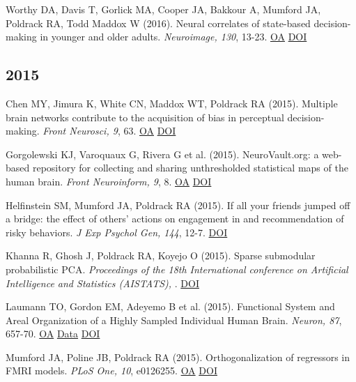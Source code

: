 \documentclass[10pt, letterpaper]{article}
\begin{document}
Worthy DA, Davis T, Gorlick MA, Cooper JA, Bakkour A, Mumford JA, Poldrack RA, Todd Maddox W (2016). Neural correlates of state-based decision-making in younger and older adults. \textit{Neuroimage, 130}, 13-23. \href{https://www.ncbi.nlm.nih.gov/pmc/articles/PMC4808466}{OA} \href{http://dx.doi.org/10.1016/j.neuroimage.2015.12.004}{DOI} \vspace{2mm}

\subsection*{2015}Chen MY, Jimura K, White CN, Maddox WT, Poldrack RA (2015). Multiple brain networks contribute to the acquisition of bias in perceptual decision-making. \textit{Front Neurosci, 9}, 63. \href{https://www.ncbi.nlm.nih.gov/pmc/articles/PMC4350407}{OA} \href{http://dx.doi.org/10.3389/fnins.2015.00063}{DOI} \vspace{2mm}

Gorgolewski KJ, Varoquaux G, Rivera G et al. (2015). NeuroVault.org: a web-based repository for collecting and sharing unthresholded statistical maps of the human brain. \textit{Front Neuroinform, 9}, 8. \href{https://www.ncbi.nlm.nih.gov/pmc/articles/PMC4392315}{OA} \href{http://dx.doi.org/10.3389/fninf.2015.00008}{DOI} \vspace{2mm}

Helfinstein SM, Mumford JA, Poldrack RA (2015). If all your friends jumped off a bridge: the effect of others' actions on engagement in and recommendation of risky behaviors. \textit{J Exp Psychol Gen, 144}, 12-7. \href{http://dx.doi.org/10.1037/xge0000043}{DOI} \vspace{2mm}

Khanna R, Ghosh J, Poldrack RA, Koyejo O (2015). Sparse submodular probabilistic PCA. \textit{Proceedings of the 18th International conference on Artificial Intelligence and Statistics (AISTATS), }. \href{http://dx.doi.org/None}{DOI} \vspace{2mm}

Laumann TO, Gordon EM, Adeyemo B et al. (2015). Functional System and Areal Organization of a Highly Sampled Individual Human Brain. \textit{Neuron, 87}, 657-70. \href{https://www.ncbi.nlm.nih.gov/pmc/articles/PMC4642864}{OA} \href{https://openneuro.org/datasets/ds000031/versions/00001}{Data} \href{http://dx.doi.org/10.1016/j.neuron.2015.06.037}{DOI} \vspace{2mm}

Mumford JA, Poline JB, Poldrack RA (2015). Orthogonalization of regressors in FMRI models. \textit{PLoS One, 10}, e0126255. \href{https://www.ncbi.nlm.nih.gov/pmc/articles/PMC4412813}{OA} \href{http://dx.doi.org/10.1371/journal.pone.0126255}{DOI} \vspace{2mm}
\end{document}
